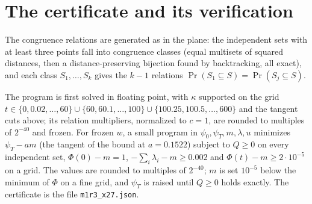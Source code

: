 \documentclass[11pt,a4paper]{amsart}
\theoremstyle{remark}
\begin{document}
\section{The certificate and its verification}\label{sec:checks}

The congruence relations are generated as in the plane: the independent sets with at least three points fall into
congruence classes (equal multisets of squared distances, then a distance-preserving bijection found by backtracking,
all exact), and each class $S_1,\dots,S_k$ gives the $k-1$ relations $\Pr(S_1\subseteq S)=\Pr(S_j\subseteq S)$.

The program is first solved in floating point, with $\kappa$ supported on the grid $t\in\{0,0.02,\dots,60\}\cup
\{60,60.1,\dots,100\}\cup\{100.25,100.5,\dots,600\}$ and the tangent cuts above; its relation multipliers, normalized to
$c=1$, are rounded to multiples of $2^{-40}$ and frozen. For frozen $w$, a small program in $\psi_0,\psi_T,m,\lambda,u$
minimizes $\psi_T-am$ (the tangent of the bound at $a=0.1522$) subject to $Q\ge0$ on every independent set,
$\Phi(0)-m=1$, $-\sum_i\lambda_i-m\ge0.002$ and $\Phi(t)-m\ge2\cdot10^{-5}$ on a grid. The values are rounded to multiples
of $2^{-40}$; $m$ is set $10^{-5}$ below the minimum of $\Phi$ on a fine grid, and $\psi_T$ is raised until $Q\ge0$ holds
exactly. The certificate is the file \texttt{m1r3\_x27.json}.
\end{document}
